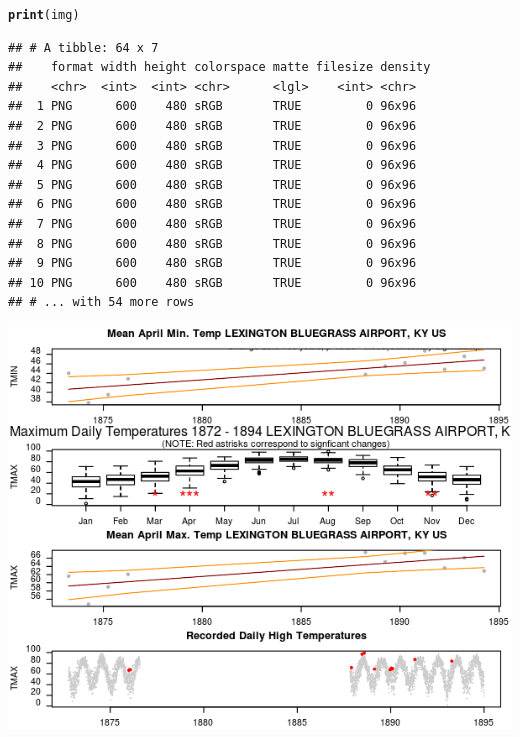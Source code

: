 \documentclass{article}\usepackage[]{graphicx}\usepackage[]{color}
\makeatletter
\def\maxwidth{ %
  \ifdim\Gin@nat@width>\linewidth
    \linewidth
  \else
    \Gin@nat@width
  \fi
}
\newcommand{\hlstd}[1]{\textcolor[rgb]{0.345,0.345,0.345}{#1}}%
\newcommand{\hlkwd}[1]{\textcolor[rgb]{0.737,0.353,0.396}{\textbf{#1}}}%
\newenvironment{kframe}{%
 \def\at@end@of@kframe{}%
 \ifinner\ifhmode%
  \def\at@end@of@kframe{\end{minipage}}%
  \begin{minipage}{\columnwidth}%
 \fi\fi%
 \def\FrameCommand##1{\hskip\@totalleftmargin \hskip-\fboxsep
 \colorbox{shadecolor}{##1}\hskip-\fboxsep
     \hskip-\linewidth \hskip-\@totalleftmargin \hskip\columnwidth}%
 \MakeFramed {\advance\hsize-\width
   \@totalleftmargin\z@ \linewidth\hsize
   \@setminipage}}%
 {\par\unskip\endMakeFramed%
 \at@end@of@kframe}
\newenvironment{knitrout}{}{} %
\makeatother
\begin{document}
\begin{knitrout}
\color{fgcolor}\begin{kframe}
\begin{alltt}
\hlkwd{print}\hlstd{(img)}
\end{alltt}
\begin{verbatim}
## # A tibble: 64 x 7
##    format width height colorspace matte filesize density
##    <chr>  <int>  <int> <chr>      <lgl>    <int> <chr>  
##  1 PNG      600    480 sRGB       TRUE         0 96x96  
##  2 PNG      600    480 sRGB       TRUE         0 96x96  
##  3 PNG      600    480 sRGB       TRUE         0 96x96  
##  4 PNG      600    480 sRGB       TRUE         0 96x96  
##  5 PNG      600    480 sRGB       TRUE         0 96x96  
##  6 PNG      600    480 sRGB       TRUE         0 96x96  
##  7 PNG      600    480 sRGB       TRUE         0 96x96  
##  8 PNG      600    480 sRGB       TRUE         0 96x96  
##  9 PNG      600    480 sRGB       TRUE         0 96x96  
## 10 PNG      600    480 sRGB       TRUE         0 96x96  
## # ... with 54 more rows
\end{verbatim}
\end{kframe}
\includegraphics[width=\maxwidth]{figure/print_img-1} 
\end{knitrout}
\end{document}
